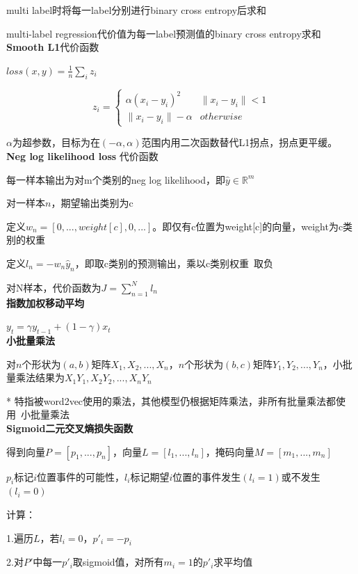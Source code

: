 \documentclass[UTF8]{ctexart}
\begin{document}
  \quad \quad multi label时将每一label分别进行binary cross entropy后求和
  
  \quad multi-label regression代价值为每一label预测值的binary cross entropy求和\\
\textbf{Smooth L1}代价函数

  $loss(x, y) = \frac{1}{n}\sum_iz_i$

  \begin{equation*}
    z_i = \begin{cases}
      \alpha (x_i - y_i)^2 & \|x_i - y_i\| < 1\\
      \|x_i - y_i\| - \alpha & otherwise
    \end{cases}
  \end{equation*}

  \quad $\alpha$为超参数，目标为在$(-\alpha, \alpha)$范围内用二次函数替代L1拐点，拐点更平缓。\\
\textbf{Neg log likelihood loss} 代价函数

  每一样本输出为对m个类别的neg log likelihood，即$\hat{y} \in \mathbb{R}^m$

  对一样本$n$，期望输出类别为c
  
  \quad 定义$w_n = [0, ..., weight[c], 0, ...]$。即仅有c位置为weight[c]的向量，weight为c类别的权重

  \quad 定义$l_n = -w_n\hat{y}_n$，即取c类别的预测输出，乘以c类别权重\ 取负

  对N样本，代价函数为$J = \sum_{n=1}^Nl_n$\\  
\textbf{指数加权移动平均}

  $y_t = \gamma y_{t-1}+(1-\gamma)x_t$\\
\textbf{小批量乘法}

  对$n$个形状为$(a, b)$矩阵$X_1, X_2, ..., X_n$，$n$个形状为$(b, c)$矩阵$Y_1, Y_2, ..., Y_n$，小批量乘法结果为$X_1Y_1, X_2Y_2, ..., X_nY_n$

  * 特指被word2vec使用的乘法，其他模型仍根据矩阵乘法，非所有批量乘法都使用\ 小批量乘法\\
\textbf{Sigmoid二元交叉熵损失函数}

  得到向量$P = [p_1, ..., p_n]$，向量$L = [l_1, ..., l_n]$，掩码向量$M = [m_1, ..., m_n]$

  \quad $p_i$标记$i$位置事件的可能性，$l_i$标记期望$i$位置的事件发生$(l_i = 1)$或不发生$(l_i = 0)$

  计算：

  \quad 1.遍历$L$，若$l_i = 0$，$p'_i = -p_i$

  \quad 2.对$P'$中每一$p'_i$取sigmoid值，对所有$m_i = 1$的$p'_i$求平均值
\end{document}
